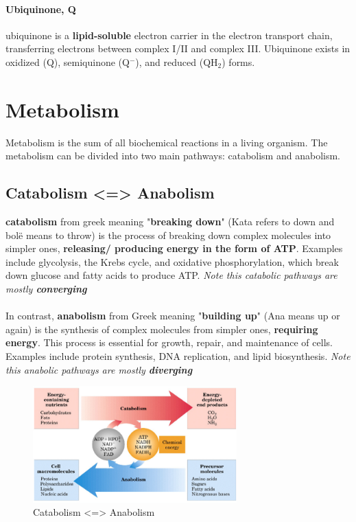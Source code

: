 \documentclass[../main.tex]{subfiles}
\begin{document}
\paragraph{Ubiquinone, Q}
\gls{ubiquinone} is a \textbf{lipid-soluble} electron carrier in the electron transport chain, transferring electrons between complex I/II and complex III. Ubiquinone exists in oxidized (Q), semiquinone (Q$^-$), and reduced (QH$_2$) forms.

\section{Metabolism}
Metabolism is the sum of all biochemical reactions in a living organism. The metabolism can be divided into two main pathways: catabolism and anabolism. 

\subsection{Catabolism <=> Anabolism}
\textbf{\gls{catabolism}} from greek meaning "\textbf{breaking down}" (Kata refers to down and bolë means to throw) is the process of breaking down complex molecules into simpler ones, \textbf{releasing/ producing energy in the form of ATP}. Examples include glycolysis, the Krebs cycle, and oxidative phosphorylation, which break down glucose and fatty acids to produce ATP. \textit{Note this catabolic pathways are mostly \textbf{converging}} \\
\\
In contrast, \textbf{\gls{anabolism}} from Greek meaning "\textbf{building up}" (Ana means up or again) is the synthesis of complex molecules from simpler ones, \textbf{requiring energy}. This process is essential for growth, repair, and maintenance of cells. Examples include protein synthesis, DNA replication, and lipid biosynthesis. \textit{Note this anabolic pathways are mostly \textbf{diverging}} 

\begin{figure}[H]
	\centering
	\includegraphics[width=0.7\textwidth]{cata_ana}
	\caption{Catabolism <=> Anabolism}
\end{figure}
\end{document}
